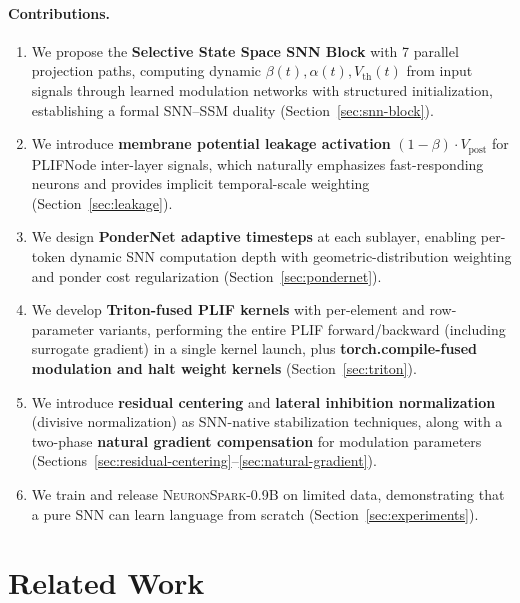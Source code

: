 \documentclass[10pt,twocolumn]{article}
\newcommand{\model}{\textsc{NeuronSpark}}
\newcommand{\vpost}{V_{\text{post}}}
\newcommand{\vth}{V_{\text{th}}}
\begin{document}
\paragraph{Contributions.}
\begin{enumerate}
    \item We propose the \textbf{Selective State Space SNN Block} with 7 parallel projection paths, computing dynamic $\beta(t), \alpha(t), \vth(t)$ from input signals through learned modulation networks with structured initialization, establishing a formal SNN--SSM duality (Section~\ref{sec:snn-block}).

    \item We introduce \textbf{membrane potential leakage activation} $(1-\beta)\cdot\vpost$ for PLIFNode inter-layer signals, which naturally emphasizes fast-responding neurons and provides implicit temporal-scale weighting (Section~\ref{sec:leakage}).

    \item We design \textbf{PonderNet adaptive timesteps} at each sublayer, enabling per-token dynamic SNN computation depth with geometric-distribution weighting and ponder cost regularization (Section~\ref{sec:pondernet}).

    \item We develop \textbf{Triton-fused PLIF kernels} with per-element and row-parameter variants, performing the entire PLIF forward/backward (including surrogate gradient) in a single kernel launch, plus \textbf{torch.compile-fused modulation and halt weight kernels} (Section~\ref{sec:triton}).

    \item We introduce \textbf{residual centering} and \textbf{lateral inhibition normalization} (divisive normalization) as SNN-native stabilization techniques, along with a two-phase \textbf{natural gradient compensation} for modulation parameters (Sections~\ref{sec:residual-centering}--\ref{sec:natural-gradient}).

    \item We train and release \model{}-0.9B on limited data, demonstrating that a pure SNN can learn language from scratch (Section~\ref{sec:experiments}).
\end{enumerate}


\section{Related Work}
\label{sec:related}
\end{document}
